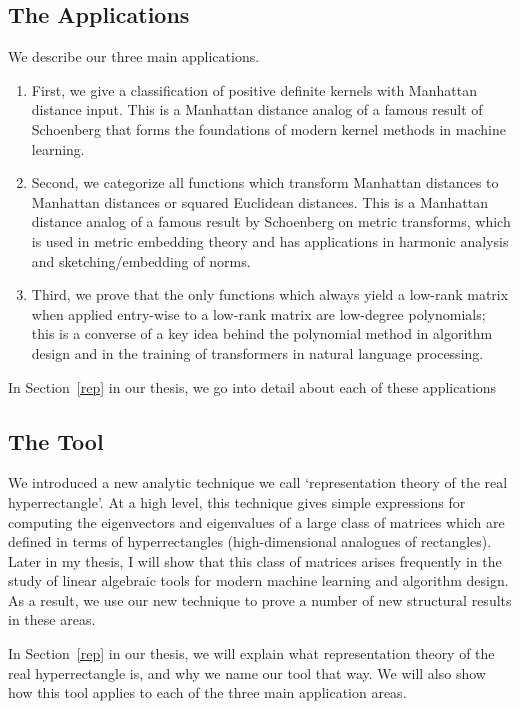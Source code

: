 \subsection{The Applications}
We describe our three main applications. 
\begin{enumerate}
\item First, we
give a classification of positive definite kernels with Manhattan
distance input. This is a Manhattan distance analog of a famous result
of Schoenberg that forms the foundations of modern kernel methods in
machine learning. 
\item Second, we categorize all functions which transform
Manhattan distances to Manhattan distances or squared Euclidean
distances. This is a Manhattan distance analog of a famous result by
Schoenberg on metric transforms, which is used in metric embedding
theory and has applications in harmonic analysis and sketching/embedding
of norms. 
\item Third, we prove that the only functions which always yield a low-rank matrix when applied entry-wise to a low-rank matrix are low-degree polynomials; this is a converse of a key idea behind the polynomial method in algorithm design and in the training of transformers in natural language processing. 
\end{enumerate}

In Section~\ref{rep} in our thesis, we go into detail about each of
these applications

\subsection{The Tool}
We introduced a new analytic technique we call
`representation theory of the real hyperrectangle'. At a high level,
  this technique gives simple expressions for computing the eigenvectors
  and eigenvalues of a large class of matrices which are defined in
  terms of hyperrectangles (high-dimensional analogues of rectangles).
  Later in my thesis, I will show that this class of matrices arises
  frequently in the study of linear algebraic tools for modern machine
  learning and algorithm design. As a result, we use our new technique
  to prove a number of new structural results in these areas.

  In Section~\ref{rep} in our thesis, we will explain what
  representation theory of the real hyperrectangle is, and why we name
  our tool that way. We will also show how this tool applies to each of
  the three main application areas.

